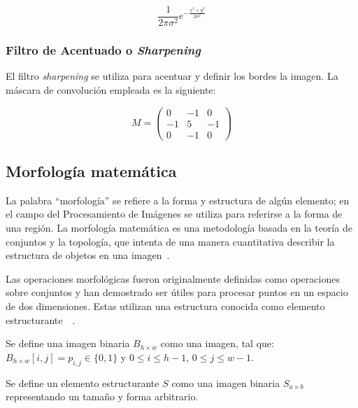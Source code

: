 \begin{equation}
	\frac{1}{2\pi\sigma^2} e^{-\frac{x^2 + y^2}{2\sigma^2}}
\end{equation}

\subsubsection{Filtro de Acentuado o \textit{Sharpening}}

El filtro \textit{sharpening} se utiliza para acentuar y definir los bordes la imagen. La máscara de convolución empleada es la siguiente:

\begin{equation}
	M = \begin{pmatrix} 
		0 & -1 & 0 \\
		-1 & 5 & -1 \\ 
		0 & -1 & 0
	\end{pmatrix}
\end{equation}

\subsection{Morfología matemática}

La palabra ``morfología'' se refiere a la forma y estructura de algún elemento; en el campo del Procesamiento de Imágenes se utiliza para referirse a la forma de una región. La morfología matemática es una metodología basada en la teoría de conjuntos y la topología, que intenta de una manera cuantitativa describir la estructura de objetos en una imagen~\cite{bovik2009essential}.

Las operaciones morfológicas fueron originalmente definidas como operaciones sobre conjuntos y han demostrado ser útiles para procesar puntos en un espacio de dos dimensiones. Estas utilizan una estructura conocida como elemento estructurante~\cite{soille1999morphological}~\cite{haralick1987image}.

\begin{definition}
	Se define una imagen binaria $B_{h \times w}$ como una imagen, tal que: $B_{h \times w}[i, j] = p_{i, j} \in \{0, 1\}$ y $0 \leq i \leq h - 1$, $ 0 \leq j \leq w-1$.
\end{definition}

\begin{definition}
	Se define un elemento estructurante $S$ como una imagen binaria $S_{a \times b}$ representando un tamaño y forma arbitrario.
\end{definition}

